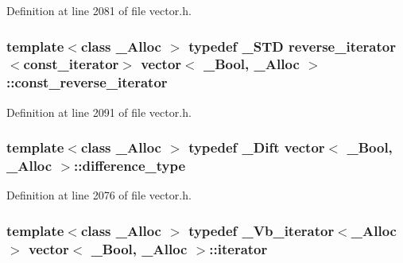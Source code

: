 Definition at line 2081 of file vector.\+h.

\hypertarget{classvector_3_01___bool_00_01___alloc_01_4_a519201ff91b19c9cf5f448eee90401d8}{
\subsubsection[{const\+\_\+reverse\+\_\+iterator}]{\setlength{\rightskip}{0pt plus 5cm}template$<$class \+\_\+\+Alloc $>$ typedef \+\_\+\+S\+T\+D {\bf reverse\+\_\+iterator}$<${\bf const\+\_\+iterator}$>$ {\bf vector}$<$ \+\_\+\+Bool, \+\_\+\+Alloc $>$\+::{\bf const\+\_\+reverse\+\_\+iterator}}}\label{classvector_3_01___bool_00_01___alloc_01_4_a519201ff91b19c9cf5f448eee90401d8}


Definition at line 2091 of file vector.\+h.

\hypertarget{classvector_3_01___bool_00_01___alloc_01_4_ada17d1119c13b3e998d89dcec059b2ce}{
\subsubsection[{difference\+\_\+type}]{\setlength{\rightskip}{0pt plus 5cm}template$<$class \+\_\+\+Alloc $>$ typedef {\bf \+\_\+\+Dift} {\bf vector}$<$ \+\_\+\+Bool, \+\_\+\+Alloc $>$\+::{\bf difference\+\_\+type}}}\label{classvector_3_01___bool_00_01___alloc_01_4_ada17d1119c13b3e998d89dcec059b2ce}


Definition at line 2076 of file vector.\+h.

\hypertarget{classvector_3_01___bool_00_01___alloc_01_4_a151edfa584da275286dbb10b3992940e}{
\subsubsection[{iterator}]{\setlength{\rightskip}{0pt plus 5cm}template$<$class \+\_\+\+Alloc $>$ typedef {\bf \+\_\+\+Vb\+\_\+iterator}$<$\+\_\+\+Alloc$>$ {\bf vector}$<$ \+\_\+\+Bool, \+\_\+\+Alloc $>$\+::{\bf iterator}}}\label{classvector_3_01___bool_00_01___alloc_01_4_a151edfa584da275286dbb10b3992940e}


